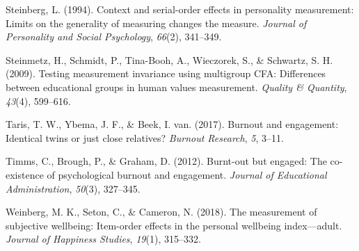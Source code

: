 \documentclass[
  man]{apa6}
\newlength{\cslhangindent}
\newlength{\cslentryspacingunit} %
\newenvironment{CSLReferences}[2] %
 {%
  \setlength{\parindent}{0pt}
  \ifodd #1
  \let\oldpar\par
  \def\par{\hangindent=\cslhangindent\oldpar}
  \fi
  \setlength{\parskip}{#2\cslentryspacingunit}
 }%
 {}
\begin{document}
\begin{CSLReferences}{1}{0}
\leavevmode{}%
Steinberg, L. (1994). Context and serial-order effects in personality measurement: Limits on the generality of measuring changes the measure. \emph{Journal of Personality and Social Psychology}, \emph{66}(2), 341--349.

\leavevmode{}%
Steinmetz, H., Schmidt, P., Tina-Booh, A., Wieczorek, S., \& Schwartz, S. H. (2009). Testing measurement invariance using multigroup CFA: Differences between educational groups in human values measurement. \emph{Quality \& Quantity}, \emph{43}(4), 599--616.

\leavevmode{}%
Taris, T. W., Ybema, J. F., \& Beek, I. van. (2017). Burnout and engagement: Identical twins or just close relatives? \emph{Burnout Research}, \emph{5}, 3--11.

\leavevmode{}%
Timms, C., Brough, P., \& Graham, D. (2012). Burnt-out but engaged: The co-existence of psychological burnout and engagement. \emph{Journal of Educational Administration}, \emph{50}(3), 327--345.

\leavevmode{}%
Weinberg, M. K., Seton, C., \& Cameron, N. (2018). The measurement of subjective wellbeing: Item-order effects in the personal wellbeing index---adult. \emph{Journal of Happiness Studies}, \emph{19}(1), 315--332.

\end{CSLReferences}

\endgroup
\end{document}
